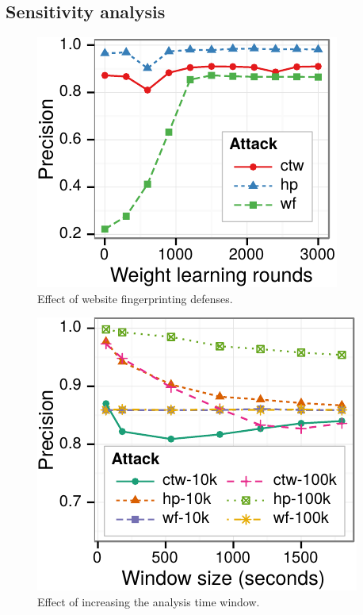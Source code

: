 \subsection{Sensitivity analysis}


\begin{figure}[t]
\centering
\includegraphics[width=0.7\linewidth]{figures/fpt/rounds/1kx100+100k-ggplot2}
\caption{Effect of website fingerprinting defenses.}
\label{fig:fpt:var:rounds}
\end{figure}

\begin{figure}[t]
\centering
    \includegraphics[width=0.95\linewidth]{figures/fpt/window/1kx100+100k-ggplot2}
\caption{Effect of increasing the analysis time window.}
    \label{fig:fpt:var:window}
\end{figure}

